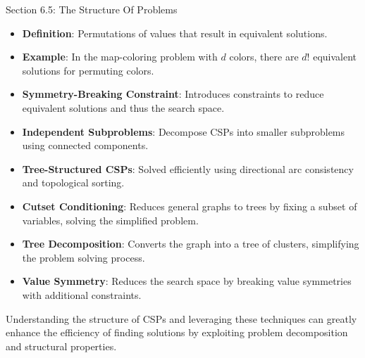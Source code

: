 \begin{notes}{Section 6.5: The Structure Of Problems}
    \begin{highlight}
    
        \begin{itemize}
            \item \textbf{Definition}: Permutations of values that result in equivalent solutions.
            \item \textbf{Example}: In the map-coloring problem with $d$ colors, there are $d!$ equivalent solutions for permuting colors.
            \item \textbf{Symmetry-Breaking Constraint}: Introduces constraints to reduce equivalent solutions and thus the search space.
        \end{itemize}
    
    \end{highlight}
    
    \begin{highlight}
    
        \begin{itemize}
            \item \textbf{Independent Subproblems}: Decompose CSPs into smaller subproblems using connected components.
            \item \textbf{Tree-Structured CSPs}: Solved efficiently using directional arc consistency and topological sorting.
            \item \textbf{Cutset Conditioning}: Reduces general graphs to trees by fixing a subset of variables, solving the simplified problem.
            \item \textbf{Tree Decomposition}: Converts the graph into a tree of clusters, simplifying the problem solving process.
            \item \textbf{Value Symmetry}: Reduces the search space by breaking value symmetries with additional constraints.
        \end{itemize}
    
        Understanding the structure of CSPs and leveraging these techniques can greatly enhance the efficiency of finding solutions by exploiting problem decomposition and structural properties.
    
    \end{highlight}
\end{notes}